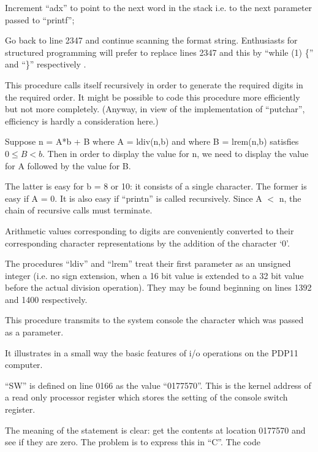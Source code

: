 \item[2361:] Increment ``adx'' to point to the
 next word in the stack i.e. to
 the next parameter passed to
 ``printf'';

\item[2362:] Go back to line 2347 and continue
 scanning the format string.
 Enthusiasts for structured programming will prefer to replace
 lines 2347 and this by
 ``while (1) \{'' and ``\}''
respectively .
\ed


This procedure calls itself recursively
in order to generate the required
digits in the required order. It might
be possible to code this procedure more
efficiently but not more completely.
(Anyway, in view of the implementation
of ``putchar'', efficiency is hardly a
consideration here.)

Suppose n = A*b + B where A = ldiv(n,b)
and where B = lrem(n,b) satisfies
$0 \le B < b$. Then in order to display the
value for n, we need to display the
value for A followed by the value for B.


The latter is easy for b = 8 or 10: it
consists of a single character. The
former is easy if A = 0. It is also
easy if ``printn'' is called recursively.
Since A $<$ n, the chain of recursive
calls must terminate.

\bd
\item[2375:] Arithmetic values corresponding
 to digits are conveniently converted to their corresponding
 character representations by the
 addition of the character `0'.
\ed


The procedures ``ldiv'' and ``lrem'' treat
their first parameter as an unsigned
integer (i.e. no sign extension, when a
16 bit value is extended to a 32 bit
value before the actual division operation). They may be found beginning on
lines 1392 and 1400 respectively.



This procedure transmits to the system
console the character which was passed
as a parameter.

It illustrates in a small way the basic
features of i/o operations on the PDP11
computer.

\bd
\item[2391:] ``SW'' is defined on line 0166 as
 the value ``0177570''. This is the
kernel address of a read only
processor register which stores
the setting of the console switch
register.

The meaning of the statement is
clear: get the contents at location 0177570 and see if they are
zero. The problem is to express
this in ``C''. The code

